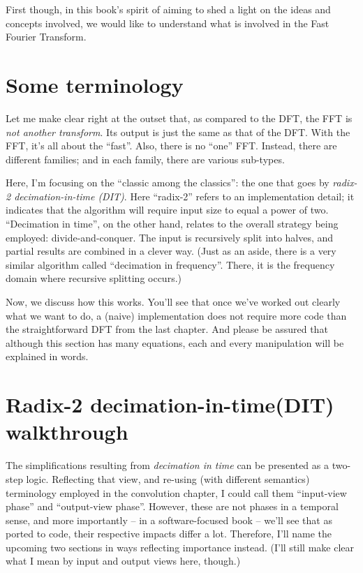 \documentclass[
  letterpaper,
]{krantz}
\begin{document}
First though, in this book's spirit of aiming to shed a light on the
ideas and concepts involved, we would like to understand what is
involved in the Fast Fourier Transform.

\hypertarget{some-terminology}{%
\section{Some terminology}\label{some-terminology}}

Let me make clear right at the outset that, as compared to the DFT, the
FFT is \emph{not another transform}. Its output is just the same as that
of the DFT. With the FFT, it's all about the ``fast''. Also, there is no
``one'' FFT. Instead, there are different families; and in each family,
there are various sub-types.

Here, I'm focusing on the ``classic among the classics'': the one that
goes by \emph{radix-2 decimation-in-time (DIT)}. Here ``radix-2'' refers
to an implementation detail; it indicates that the algorithm will
require input size to equal a power of two. ``Decimation in time'', on
the other hand, relates to the overall strategy being employed:
divide-and-conquer. The input is recursively split into halves, and
partial results are combined in a clever way. (Just as an aside, there
is a very similar algorithm called ``decimation in frequency''. There,
it is the frequency domain where recursive splitting occurs.)

Now, we discuss how this works. You'll see that once we've worked out
clearly what we want to do, a (naive) implementation does not require
more code than the straightforward DFT from the last chapter. And please
be assured that although this section has many equations, each and every
manipulation will be explained in words.

\hypertarget{radix-2-decimation-in-timedit-walkthrough}{%
\section{\texorpdfstring{Radix-2 decimation-in-time(DIT)
walkthrough}{Radix-2 decimation-in-time(DIT) walkthrough}}\label{radix-2-decimation-in-timedit-walkthrough}}

The simplifications resulting from \emph{decimation in time} can be
presented as a two-step logic. Reflecting that view, and re-using (with
different semantics) terminology employed in the convolution chapter, I
could call them ``input-view phase'' and ``output-view phase''. However,
these are not phases in a temporal sense, and more importantly -- in a
software-focused book -- we'll see that as ported to code, their
respective impacts differ a lot. Therefore, I'll name the upcoming two
sections in ways reflecting importance instead. (I'll still make clear
what I mean by input and output views here, though.)
\end{document}
